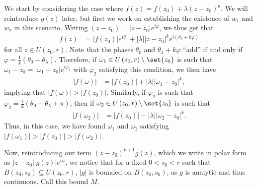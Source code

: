 \documentclass[10pt]{mypackage}
\begin{document}
\begin{solution}
\begin{enumerate}[(a)]
      We start by considering the case where $f(z) = f\left(z_0\right) + \lambda \left( z-z_0 \right)^{k}$. We will reintroduce $g(z)$ later, but first we work on establishing the existence of $w_1$ and $w_2$ in this scenario. Writing $\left( z-z_0 \right) = \left\vert z-z_0 \right\vert e^{i\varphi}$, we thus get that
      \begin{align*}
        f(z) &= \left\vert f\left( z_0 \right) \right\vert e^{i\theta_0} + \left\vert \lambda \right\vert \left\vert z-z_0 \right\vert^{k} e^{i\left( \theta_{\lambda} + k\varphi \right)}
      \end{align*}
      for all $z\in U\left( z_0,r \right)$. Note that the phases $\theta_0$ and $\theta_{\lambda} + k\varphi$ ``add'' if and only if $\varphi = \frac{1}{k} \left( \theta_{0} - \theta_{\lambda} \right)$. Therefore, if $\omega_1\in U\left( z_0,r \right)\setminus \set{z_0}$ is such that $\omega_1 - z_0 = \left\vert \omega_1 - z_0 \right\vert e^{i \varphi_1}$ with $\varphi_2$ satisfying this condition, we then have
      \begin{align*}
        \left\vert f\left( \omega \right) \right\vert &= \left\vert f\left( z_0 \right) \right\vert + \left\vert \lambda \right\vert \left\vert \omega_1 - z_0 \right\vert^{k},
      \end{align*}
      implying that $\left\vert f\left( \omega \right) \right\vert > \left\vert f\left( z_0 \right) \right\vert$. Similarly, if $\varphi_2$ is such that $\varphi_2 = \frac{1}{k} \left( \theta_{0} - \theta_{\lambda} + \pi \right)$, then if $\omega_2\in U\left( z_0,r \right)\setminus \set{z_0}$ is such that 
      \begin{align*}
        \left\vert f\left( \omega_2 \right) \right\vert &= \left\vert f\left( z_0 \right) \right\vert - \left\vert \lambda \right\vert\left\vert \omega_2-z_0 \right\vert^{k}.
      \end{align*}
      Thus, in this case, we have found $\omega_1$ and $\omega_2$ satisfying $\left\vert f\left( \omega_1 \right) \right\vert > \left\vert f\left( z_0 \right) \right\vert > \left\vert f\left( \omega_2 \right) \right\vert$.\newline

      Now, reintroducing our term $\left( z-z_0 \right)^{k+1}g(z)$, which we write in polar form as $\left\vert z-z_0 \right\vert \left\vert g(z) \right\vert e^{i\psi}$, we notice that for a fixed $0 < s_0 < r$ such that $B\left( z_0,s_0 \right)\subseteq U\left( z_0,r \right)$, $\left\vert g \right\vert$ is bounded on $B\left( z_0,s_0 \right)$, as $g$ is analytic and thus continuous. Call this bound $M$.\newline


\end{enumerate}
\end{solution}
\end{document}
